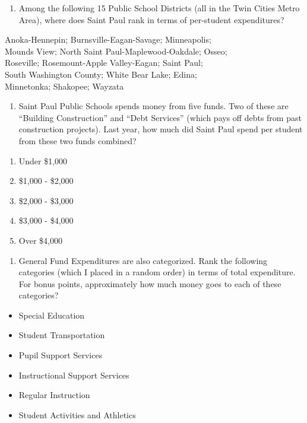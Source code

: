 \documentclass[
]{article}
\providecommand{\tightlist}{%
  \setlength{\itemsep}{0pt}\setlength{\parskip}{0pt}}
\begin{document}
\begin{enumerate}
\def\labelenumi{\arabic{enumi}.}
\setcounter{enumi}{2}
\tightlist
\item
  Among the following 15 Public School Districts (all in the Twin Cities
  Metro Area), where does Saint Paul rank in terms of per-student
  expenditures?
\end{enumerate}

Anoka-Hennepin; Burnsville-Eagan-Savage; Minneapolis;\\
Mounds View; North Saint Paul-Maplewood-Oakdale; Osseo;\\
Roseville; Rosemount-Apple Valley-Eagan; Saint Paul;\\
South Washington County; White Bear Lake; Edina;\\
Minnetonka; Shakopee; Wayzata

\begin{enumerate}
\def\labelenumi{\arabic{enumi}.}
\setcounter{enumi}{3}
\tightlist
\item
  Saint Paul Public Schools spends money from five funds. Two of these
  are ``Building Construction'' and ``Debt Services'' (which pays off
  debts from past construction projects). Last year, how much did Saint
  Paul spend per student from these two funds combined?
\end{enumerate}

\begin{enumerate}
\def\labelenumi{\alph{enumi})}
\tightlist
\item
  Under \$1,000
\item
  \$1,000 - \$2,000
\item
  \$2,000 - \$3,000
\item
  \$3,000 - \$4,000
\item
  Over \$4,000
\end{enumerate}

\begin{enumerate}
\def\labelenumi{\arabic{enumi}.}
\setcounter{enumi}{4}
\tightlist
\item
  General Fund Expenditures are also categorized. Rank the following
  categories (which I placed in a random order) in terms of total
  expenditure. For bonus points, approximately how much money goes to
  each of these categories?
\end{enumerate}

\begin{itemize}
\tightlist
\item
  Special Education
\item
  Student Transportation
\item
  Pupil Support Services
\item
  Instructional Support Services
\item
  Regular Instruction
\item
  Student Activities and Athletics
\end{itemize}
\end{document}
